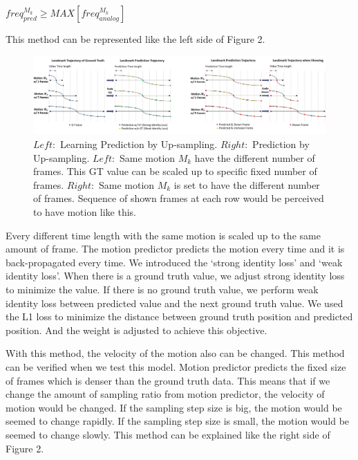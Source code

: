 \documentclass[10pt,twocolumn,letterpaper]{article}
\begin{document}
\bigskip
\begin{center}
$freq_{pred}^{M_k} \geq MAX[freq_{analog}^{M_k}] $
\end{center}
\bigskip

This method can be represented like the left side of Figure 2.

\begin{figure}
\begin{center}
\includegraphics [scale=0.4] {images/upsample.JPG}
\end{center}
 \caption{$Left:$ Learning Prediction by Up-sampling. $Right:$ Prediction by Up-sampling. $Left:$ Same motion $M_k$ have the different number of frames. This GT value can be scaled up to specific fixed number of frames. $Right:$ Same motion $M_k$ is set to have the different number of frames. Sequence of shown frames at each row would be perceived to have motion like this.}
\label{fig:short}
\end{figure}

Every different time length with the same motion is scaled up to the same amount of frame. The motion predictor predicts the motion every time and it is back-propagated every time. We introduced the ‘strong identity loss’ and ‘weak identity loss’. When there is a ground truth value, we adjust strong identity loss to minimize the value. If there is no ground truth value, we perform weak identity loss between predicted value and the next ground truth value. We used the L1 loss to minimize the distance between ground truth position and predicted position. And the weight is adjusted to achieve this objective.

With this method, the velocity of the motion also can be changed. This method can be verified when we test this model. Motion predictor predicts the fixed size of frames which is denser than the ground truth data. This means that if we change the amount of sampling ratio from motion predictor, the velocity of motion would be changed. If the sampling step size is big, the motion would be seemed to change rapidly. If the sampling step size is small, the motion would be seemed to change slowly. This method can be explained like the right side of Figure 2.
\end{document}
